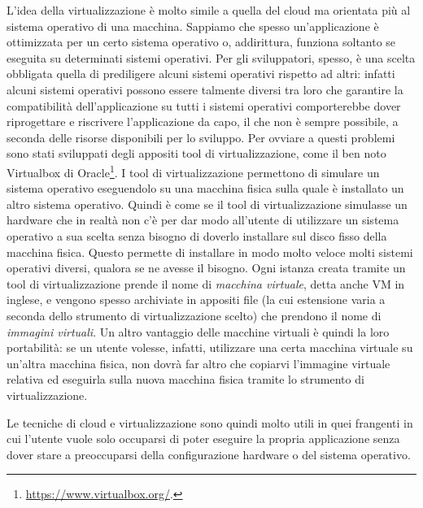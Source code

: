     L'idea della virtualizzazione è molto simile a quella del cloud ma orientata più al sistema operativo di una macchina. Sappiamo che spesso un'applicazione è ottimizzata per un certo sistema operativo o, addirittura, funziona soltanto se eseguita su determinati sistemi operativi. Per gli sviluppatori, spesso, è una scelta obbligata quella di prediligere alcuni sistemi operativi rispetto ad altri: infatti alcuni sistemi operativi possono essere talmente diversi tra loro che garantire la compatibilità dell'applicazione su tutti i sistemi operativi comporterebbe dover riprogettare e riscrivere l'applicazione da capo, il che non è sempre possibile, a seconda delle risorse disponibili per lo sviluppo. Per ovviare a questi problemi sono stati sviluppati degli appositi tool di virtualizzazione, come il ben noto Virtualbox di Oracle\footnote{\url{https://www.virtualbox.org/}.}. I tool di virtualizzazione permettono di simulare un sistema operativo eseguendolo su una macchina fisica sulla quale è installato un altro sistema operativo. Quindi è come se il tool di virtualizzazione simulasse un hardware che in realtà non c'è per dar modo all'utente di utilizzare un sistema operativo a sua scelta senza bisogno di doverlo installare sul disco fisso della macchina fisica. Questo permette di installare in modo molto veloce molti sistemi operativi diversi, qualora se ne avesse il bisogno. Ogni istanza creata tramite un tool di virtualizzazione prende il nome di \textit{macchina virtuale}, detta anche \ac{VM} in inglese, e vengono spesso archiviate in appositi file (la cui estensione varia a seconda dello strumento di virtualizzazione scelto) che prendono il nome di \textit{immagini virtuali}. Un altro vantaggio delle macchine virtuali è quindi la loro portabilità: se un utente volesse, infatti, utilizzare una certa macchina virtuale su un'altra macchina fisica, non dovrà far altro che copiarvi l'immagine virtuale relativa ed eseguirla sulla nuova macchina fisica tramite lo strumento di virtualizzazione.
    
    Le tecniche di cloud e virtualizzazione sono quindi molto utili in quei frangenti in cui l'utente vuole solo occuparsi di poter eseguire la propria applicazione senza dover stare a preoccuparsi della configurazione hardware o del sistema operativo.
    
